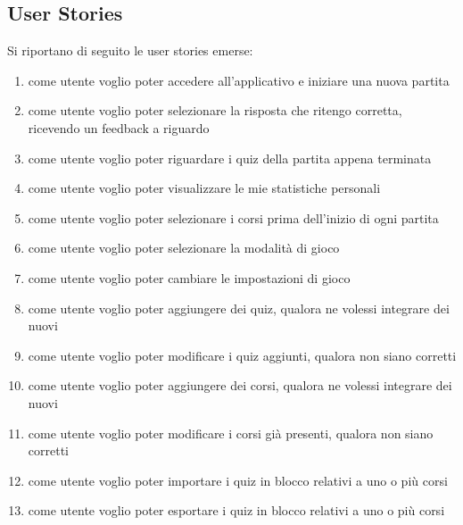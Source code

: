         \subsection{User Stories}
        \label{chap:UserStories}
        Si riportano di seguito le user stories emerse:
        \begin{enumerate}
            \item \label{us:inizio-partita} come utente voglio poter accedere all'applicativo e iniziare una nuova partita
            \item \label{us:selezione-e-feedback} come utente voglio poter selezionare la risposta che ritengo corretta, ricevendo un feedback a riguardo
            \item \label{us:revisione-quiz} come utente voglio poter riguardare i quiz della partita appena terminata
            \item \label{us:visione-statistiche} come utente voglio poter visualizzare le mie statistiche personali
            \item \label{us:selezione-corsi} come utente voglio poter selezionare i corsi prima dell'inizio di ogni partita
            \item \label{us:selezione-modalità} come utente voglio poter selezionare la modalità di gioco
            \item \label{us:impostazioni} come utente voglio poter cambiare le impostazioni di gioco
            \item \label{us:aggiunta-quiz} come utente voglio poter aggiungere dei quiz, qualora ne volessi integrare dei nuovi
            \item \label{us:modifica-quiz} come utente voglio poter modificare i quiz aggiunti, qualora non siano corretti
            \item \label{us:aggiunta-corso} come utente voglio poter aggiungere dei corsi, qualora ne volessi integrare dei nuovi
            \item \label{us:modifica-corso} come utente voglio poter modificare i corsi già presenti, qualora non siano corretti
            \item \label{us:importa-quiz} come utente voglio poter importare i quiz in blocco relativi a uno o più corsi
            \item \label{us:esporta-quiz} come utente voglio poter esportare i quiz in blocco relativi a uno o più corsi
        \end{enumerate}
        

